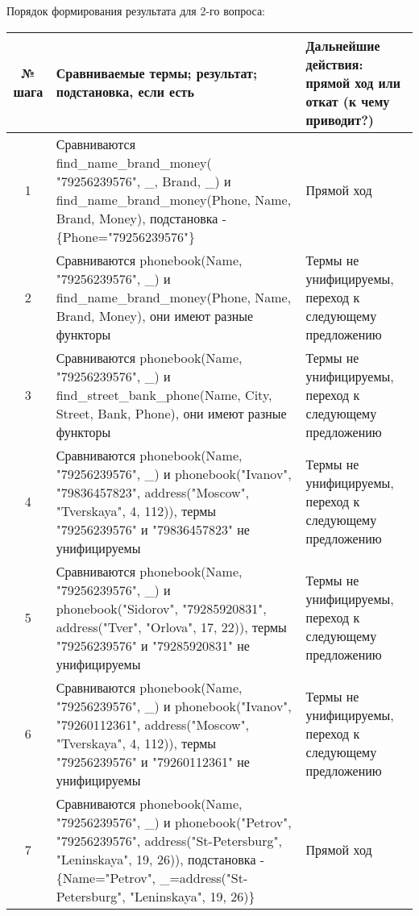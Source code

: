 \documentclass[a4paper,12pt]{article}
\begin{document}
Порядок формирования результата для 2-го вопроса:
\begin{table}[!ht]
	\begin{tabularx}{\linewidth}{|c|>{\centering}X|>{\centering}X|}
		\hline
		№ шага & Сравниваемые термы; результат; подстановка, если есть & Дальнейшие действия: прямой ход или откат (к чему приводит?)\tabularnewline
		\hline
		1 & Сравниваются find\_name\_brand\_money( "79256239576"{}, \_, Brand, \_) и find\_name\_brand\_money(Phone, Name, Brand, Money), подстановка - \{Phone="79256239576"\} &  Прямой ход  \tabularnewline
		\hline
		2 & Сравниваются phonebook(Name, "79256239576"{}, \_) и find\_name\_brand\_money(Phone, Name, Brand, Money), они имеют разные функторы & Термы не унифицируемы, переход к следующему предложению \tabularnewline
		\hline
		3 & Сравниваются phonebook(Name, "79256239576"{}, \_) и find\_street\_bank\_phone(Name, City, Street, Bank, Phone), они имеют разные функторы & Термы не унифицируемы, переход к следующему предложению \tabularnewline
		\hline
		4 & Сравниваются phonebook(Name, "79256239576"{}, \_) и phonebook("Ivanov"{}, "79836457823"{}, address("Moscow"{}, "Tverskaya"{}, 4, 112)), термы "79256239576" и "79836457823" не унифицируемы & Термы не унифицируемы, переход к следующему предложению \tabularnewline
		\hline
		5 & Сравниваются phonebook(Name, "79256239576"{}, \_) и phonebook("Sidorov"{}, "79285920831"{}, address("Tver"{}, "Orlova"{}, 17, 22)), термы "79256239576" и "79285920831" не унифицируемы & Термы не унифицируемы, переход к следующему предложению \tabularnewline
		\hline
		6 & Сравниваются phonebook(Name, "79256239576"{}, \_) и phonebook("Ivanov"{}, "79260112361"{}, address("Moscow"{}, "Tverskaya"{}, 4, 112)), термы "79256239576" и "79260112361" не унифицируемы & Термы не унифицируемы, переход к следующему предложению \tabularnewline
		\hline
		7 & Сравниваются phonebook(Name, "79256239576"{}, \_) и phonebook("Petrov"{}, "79256239576"{}, address("St-Petersburg"{}, "Leninskaya{}", 19, 26)), подстановка - \{Name="Petrov"{}, \_=address("St-Petersburg"{}, "Leninskaya{}", 19, 26)\} & Прямой ход \tabularnewline
		\hline
	\end{tabularx}
\end{table}
\newpage
\end{document}
